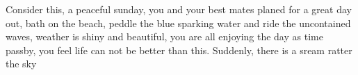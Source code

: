 Consider this, a peaceful sunday, you and your best mates planed for a great day out, bath on the beach, peddle the blue sparking water and ride the uncontained waves, weather is shiny and beautiful, you are all enjoying the day as time passby, you feel life can not be better than this. Suddenly, there is a sream ratter the sky
